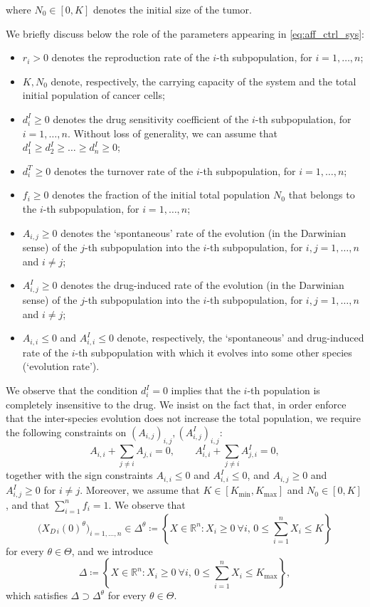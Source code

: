 \documentclass[a4paper,12pt, reqno]{amsart}
\theoremstyle{plain}
\theoremstyle{definition}
\theoremstyle{remark}
\numberwithin{equation}{section}
\newcommand{\R}{\mathbb{R}}
\begin{document}
where {$N_0\in[0,K]$} denotes the initial size of the tumor.
{We briefly discuss below the role of the parameters appearing in \cref{eq:aff_ctrl_sys}:
\begin{itemize}
    \item[-]$r_i>0$ denotes the reproduction rate of the $i$-th sub\-population, for $i=1,\ldots,n$; 
    \item[-]$K, N_0$ denote, respectively, the carrying capacity of the system and the total initial population of cancer cells;
    \item[-]$d_i^I\geq 0$ denotes the drug sensitivity coefficient of the $i$-th  sub\-population, for $i=1,\ldots,n$. Without loss of generality, we can assume that $d_1^I\geq d_2^I\geq\ldots\geq d_n^I\geq0$;
    \item[-]$d_i^T\geq 0$ denotes the turnover rate of the $i$-th  sub\-population, for $i=1,\ldots,n$;
    \item[-]$f_i\geq 0$ denotes the fraction of the initial total population $N_0$ that belongs to the $i$-th sub\-population, for $i=1,\ldots,n$;
    \item[-]$A_{i,j}\geq 0$ denotes the `spontaneous' rate of the evolution (in the Darwinian sense) of the $j$-th sub\-population into the $i$-th sub\-population, for $i,j=1,\ldots,n$ and $i\neq j$;
    \item[-]$A_{i,j}^I\geq 0$ denotes the drug-induced rate of the evolution (in the Darwinian sense) of the $j$-th sub\-population into the $i$-th sub\-population, for $i,j=1,\ldots,n$ and $i\neq j$;
    \item[-]$A_{i,i}\leq 0$ and $A^I_{i,i}\leq 0$ denote, respectively, the `spontaneous' and drug-induced rate of the $i$-th sub\-population with which it evolves into some other species (`evolution rate').
\end{itemize}
We observe that the condition $d_i^I=0$ implies that the $i$-th population is completely insensitive to the drug.
We insist on the fact that, in order enforce that the inter-species evolution does not increase the total population, we require the following constraints on $(A_{i,j})_{i,j} , (A_{i,j}^I)_{i,j}$:
\begin{equation} \label{eq:pop_conservation}
     A_{i,i} + \sum_{j\neq i}A_{j,i}=0, \qquad  A_{i,i}^I + \sum_{j\neq i}A_{j,i}^I=0,
\end{equation}
together with the sign constraints $A_{i,i}\leq 0$ and $A^I_{i,i}\leq 0$, and $A_{i,j}\geq 0$ and $A_{i,j}^I\geq 0$ for $i\neq j$.
Moreover, we assume that $K\in [K_{\min},K_{\max}]$ and $N_0\in [0,K]$, and that $\sum_{i=1}^n f_i=1$.
We observe that
\begin{equation} \label{eq:simplex_start_theta}
    \big( X_{D\, i}(0)^\theta \big)_{i=1,\ldots,n} \in \Delta^\theta \coloneqq \left\{ X \in \R^n : X_i \geq 0 \ \forall i, \, 0\leq \sum_{i=1}^n X_i \leq K \right\}
\end{equation}
for every $\theta \in \Theta$, and we introduce \begin{equation} \label{eq:simplex_start}
     \Delta \coloneqq \left\{ X \in \R^n : X_i \geq 0 \ \forall i, \, 0\leq \sum_{i=1}^n X_i \leq K_{\max} \right\},
\end{equation} 
which satisfies $\Delta\supset \Delta^\theta$ for every $\theta\in\Theta$.}
\end{document}
